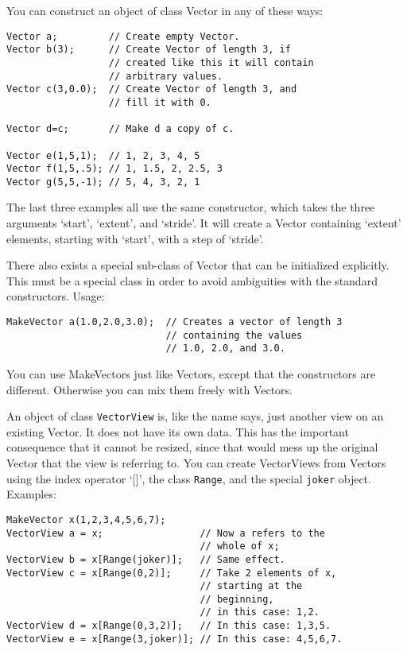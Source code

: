 You can construct an object of class Vector in any of these ways:

\begin{verbatim}
Vector a;         // Create empty Vector.
Vector b(3);      // Create Vector of length 3, if
                  // created like this it will contain
                  // arbitrary values.
Vector c(3,0.0);  // Create Vector of length 3, and
                  // fill it with 0.

Vector d=c;       // Make d a copy of c.

Vector e(1,5,1);  // 1, 2, 3, 4, 5
Vector f(1,5,.5); // 1, 1.5, 2, 2.5, 3
Vector g(5,5,-1); // 5, 4, 3, 2, 1
\end{verbatim}

The last three examples all use the same constructor, which takes
the three arguments `start', `extent', and `stride'. It will create a
Vector containing `extent' elements, starting with `start', with a
step of `stride'.

There also exists a special sub-class of Vector that can be initialized
explicitly. This must be a special class in order to avoid ambiguities
with the standard constructors. Usage:

\begin{verbatim}
MakeVector a(1.0,2.0,3.0);  // Creates a vector of length 3 
                            // containing the values 
                            // 1.0, 2.0, and 3.0.
\end{verbatim}

You can use MakeVectors just like Vectors, except that the
constructors are different. Otherwise you can mix them freely with
Vectors. 

\label{sec:vector_views}

An object of class \verb|VectorView| is, like the name says, just
another view on an existing Vector. It does not have its own
data. This has the important consequence that it cannot be resized,
since that would mess up the original Vector that the view is
referring to. You can create VectorViews from Vectors using the index
operator `[]', the class \verb|Range|, and the special \verb|joker|
object. Examples:

\begin{verbatim}
MakeVector x(1,2,3,4,5,6,7); 
VectorView a = x;                 // Now a refers to the 
                                  // whole of x;
VectorView b = x[Range(joker)];   // Same effect.
VectorView c = x[Range(0,2)];     // Take 2 elements of x, 
                                  // starting at the 
                                  // beginning,
                                  // in this case: 1,2.
VectorView d = x[Range(0,3,2)];   // In this case: 1,3,5.
VectorView e = x[Range(3,joker)]; // In this case: 4,5,6,7.
\end{verbatim}

